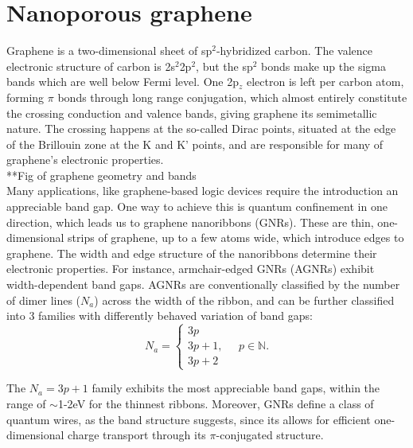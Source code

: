 
\chapter{Nanoporous graphene}

\label{ch3}


Graphene is a two-dimensional sheet of sp\(^2\)-hybridized carbon\parencite{Allen2010}. The valence electronic structure of carbon is 2s\(^2\)2p\(^2\), but the sp\(^2\) bonds make up the sigma bands which are well below Fermi level. One 2p\(_z\) electron is left per carbon atom, forming \(\pi\) bonds through long range conjugation, which almost entirely constitute the crossing conduction and valence bands, giving graphene its semimetallic nature. The crossing happens at the so-called Dirac points, situated at the edge of the Brillouin zone at the K and K' points, and are responsible for many of graphene's electronic properties.\\

**Fig of graphene geometry and bands\\

Many applications, like graphene-based logic devices\parencite{Allen2010} require the introduction an appreciable band gap. One way to achieve this is quantum confinement in one direction, which leads us to graphene nanoribbons (GNRs). These are thin, one-dimensional strips of graphene, up to a few atoms wide, which introduce edges to graphene. The width and edge structure of the nanoribbons determine their electronic properties\parencite{Wakabayashi2010}. For instance, armchair-edged GNRs (AGNRs) exhibit width-dependent band gaps\parencite{Son2006}. AGNRs are conventionally classified by the number of dimer lines (\(N_a\)) across the width of the ribbon, and can be further classified into 3 families with differently behaved variation of band gaps:
\begin{equation}
N_a=\begin{cases}3p\\3p+1,\\3p+2\end{cases}\quad p\in\mathbb{N}.
\end{equation}

The \(N_a=3p+1\) family exhibits the most appreciable band gaps, within the range of \(\sim\)1-2eV for the thinnest ribbons\parencite{MerinoDiez2017, Deniz2017, Kharche2016}. Moreover, GNRs define a class of quantum wires\parencite{Wakabayashi2010}, as the band structure suggests, since its allows for efficient one-dimensional charge transport through its \(\pi\)-conjugated structure.\\

